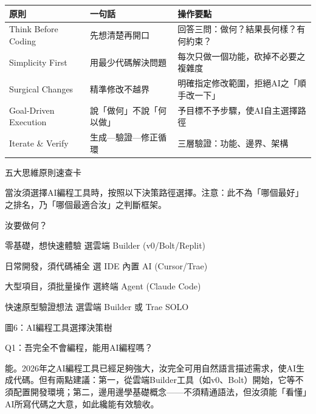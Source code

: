 


\begin{center}
\begin{tabularx}{\linewidth}{|X|X|X|}
\hline
\textbf{原則} & \textbf{一句話} & \textbf{操作要點} \tabularnewline
\hline
Think Before Coding & 先想清楚再開口 & 回答三問：做何？結果長何樣？有何約束？ \tabularnewline
Simplicity First & 用最少代碼解決問題 & 每次只做一個功能，砍掉不必要之複雜度 \tabularnewline
Surgical Changes & 精準修改不越界 & 明確指定修改範圍，拒絕AI之「順手改一下」 \tabularnewline
Goal-Driven Execution & 說「做何」不說「何以做」 & 予目標不予步驟，使AI自主選擇路徑 \tabularnewline
Iterate \& Verify & 生成—驗證—修正循環 & 三層驗證：功能、邊界、架構 \tabularnewline
\hline
\end{tabularx}
\end{center}

\begin{center}\small\color{gray}五大思維原則速查卡\end{center}


當汝須選擇AI編程工具時，按照以下決策路徑選擇。注意：此不為「哪個最好」之排名，乃「哪個最適合汝」之判斷框架。

汝要做何？

零基礎，想快速體驗 選雲端 Builder (v0/Bolt/Replit)

日常開發，須代碼補全 選 IDE 內置 AI (Cursor/Trae)

大型項目，須批量操作 選終端 Agent (Claude Code)

快速原型驗證想法 選雲端 Builder 或 Trae SOLO

\begin{center}\small\color{gray}圖6：AI編程工具選擇決策樹\end{center}


Q1：吾完全不會編程，能用AI編程嗎？

能。2026年之AI編程工具已經足夠強大，汝完全可用自然語言描述需求，使AI生成代碼。但有兩點建議：第一，從雲端Builder工具（如v0、Bolt）開始，它等不須配置開發環境；第二，邊用邊學基礎概念——不須精通語法，但汝須能「看懂」AI所寫代碼之大意，如此纔能有效驗收。

